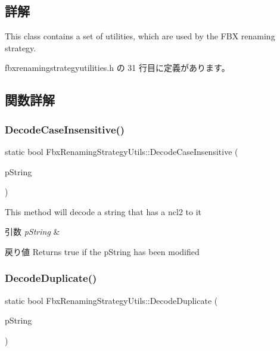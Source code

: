 \subsection{詳解}
This class contains a set of utilities, which are used by the F\+BX renaming strategy. 

 fbxrenamingstrategyutilities.\+h の 31 行目に定義があります。



\subsection{関数詳解}
\mbox{\label{class_fbx_renaming_strategy_utils_a9f252cd7a3b44f25e7bb421e11acc512}} 
\subsubsection{\texorpdfstring{Decode\+Case\+Insensitive()}{DecodeCaseInsensitive()}}
{\footnotesize\ttfamily static bool Fbx\+Renaming\+Strategy\+Utils\+::\+Decode\+Case\+Insensitive (\begin{DoxyParamCaption}\item[{\hyperlink{class_fbx_string}{Fbx\+String} \&}]{p\+String }\end{DoxyParamCaption})\hspace{0.3cm}{\ttfamily [static]}}

This method will decode a string that has a ncl2 to it 
\begin{DoxyParams}{引数}
{\em p\+String} & \\
\hline
\end{DoxyParams}
\begin{DoxyReturn}{戻り値}
Returns true if the p\+String has been modified 
\end{DoxyReturn}
\mbox{\label{class_fbx_renaming_strategy_utils_a52105ea9c53b3a5bdb064435b6027f7b}} 
\subsubsection{\texorpdfstring{Decode\+Duplicate()}{DecodeDuplicate()}}
{\footnotesize\ttfamily static bool Fbx\+Renaming\+Strategy\+Utils\+::\+Decode\+Duplicate (\begin{DoxyParamCaption}\item[{\hyperlink{class_fbx_string}{Fbx\+String} \&}]{p\+String }\end{DoxyParamCaption})\hspace{0.3cm}{\ttfamily [static]}}

